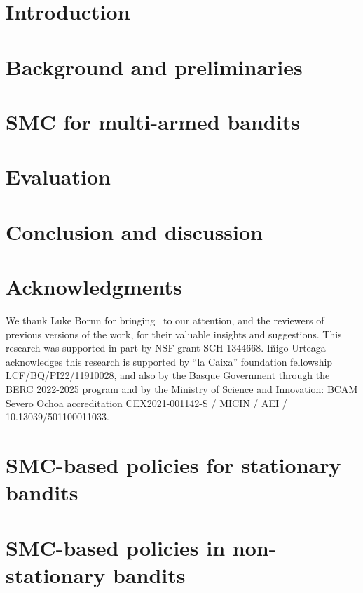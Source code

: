 \documentclass{article}
\begin{document}
\section{Introduction}
\label{intro}


\section{Background and preliminaries}
\label{sec:background}


\section{SMC for multi-armed bandits}
\label{sec:smc_mab}


\clearpage
\section{Evaluation}
\label{sec:evaluation}


\section{Conclusion and discussion}
\label{sec:conclusion}


\section*{Acknowledgments}
We thank Luke Bornn for bringing~\citep{j-Cherkassky2013} to our attention,
and the reviewers of previous versions of the work, for their valuable insights and suggestions.
This research was supported in part by NSF grant SCH-1344668.
I\~{n}igo Urteaga acknowledges
this research is supported by ``la Caixa'' foundation fellowship LCF/BQ/PI22/11910028,
and also by the Basque Government through the BERC 2022-2025 program
and by the Ministry of Science and Innovation: BCAM Severo Ochoa accreditation
CEX2021-001142-S / MICIN / AEI / 10.13039/501100011033.

%


\clearpage
\appendix

\section{SMC-based policies for stationary bandits}
\label{asec:static_bandits}


\clearpage
\section{SMC-based policies in non-stationary bandits}
\label{asec:dynamic_bandits}

\end{document}
